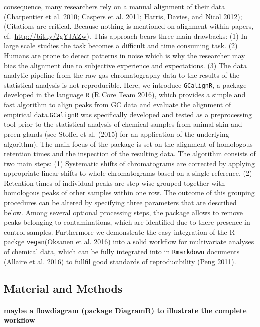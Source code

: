 \documentclass[]{article}
\let\oldparagraph\paragraph
\renewcommand{\paragraph}[1]{\oldparagraph{#1}\mbox{}}
\begin{document}
consequence, many researchers rely on a manual alignment of their data
(Charpentier et al. 2010; Caspers et al. 2011; Harris, Davies, and Nicol
2012); (Citations are critical. Because nothing is mentioned on
alignment within papers, cf.~\url{http://bit.ly/2gYJAZw}). This approach
bears three main drawbacks: (1) In large scale studies the task becomes
a difficult and time consuming task. (2) Humans are prone to detect
patterns in noise which is why the researcher may bias the alignment due
to subjective experience and expectations. (3) The data analytic
pipeline from the raw gas-chromatography data to the results of the
statistical analysis is not reproducible. Here, we introduce
\texttt{GCalignR}, a package developed in the language \texttt{R} (R
Core Team 2016), which provides a simple and fast algorithm to align
peaks from GC data and evaluate the alignment of empirical
data.\texttt{GCalignR} was specifically developed and tested as a
preprocessing tool prior to the statistical analysis of chemical samples
from animal skin and preen glands (see Stoffel et al. (2015) for an
application of the underlying algorithm). The main focus of the package
is set on the alignment of homologous retention times and the inspection
of the resulting data. The algorithm consists of two main steps: (1)
Systematic shifts of chromatograms are corrected by applying appropriate
linear shifts to whole chromatograms based on a single reference. (2)
Retention times of individual peaks are step-wise grouped together with
homologous peaks of other samples within one row. The outcome of this
grouping procedures can be altered by specifying three parameters that
are described below. Among several optional processing steps, the
package allows to remove peaks belonging to contaminations, which are
identified due to there presence in control samples. Furthermore we
demonstrate the easy integration of the R-packge \texttt{vegan}(Oksanen
et al. 2016) into a solid workflow for multivariate analyses of chemical
data, which can be fully integrated into in \texttt{Rmarkdown} documents
(Allaire et al. 2016) to fullfil good standards of reproducibility (Peng
2011).

\subsection{Material and Methods}\label{material-and-methods}

\paragraph{maybe a flowdiagram (package DiagramR) to illustrate the
complete
workflow}\label{maybe-a-flowdiagram-package-diagramr-to-illustrate-the-complete-workflow}
\end{document}
